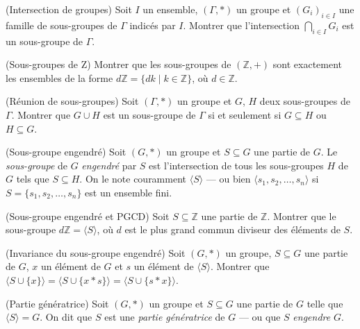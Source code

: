 \begin{exo}(Intersection de groupes)
Soit $I$ un ensemble, $(\Gamma, \ast)$ un groupe et
$(G_i)_{i \in I}$ une famille de sous-groupes de $\Gamma$ indicés par $I$.
Montrer que l'intersection $\bigcap_{i \in I}G_i$ est un sous-groupe de $\Gamma$.
\end{exo}

\begin{exo}(Sous-groupes de Z)
Montrer que les sous-groupes de $(\mathbb{Z},+)$ sont exactement les ensembles
de la forme $d \mathbb{Z} = \{d k \mid k \in \mathbb{Z}\}$, où $d \in \mathbb{Z}$.
\end{exo}

\begin{exo}(Réunion de sous-groupes)
Soit $(\Gamma, \ast)$ un groupe et
$G$, $H$ deux sous-groupes de $\Gamma$.
Montrer que $G \cup H$ est un sous-groupe de $\Gamma$ si et seulement si
$G \subseteq H$ ou $H \subseteq G$.
\end{exo}

\begin{defn}(Sous-groupe engendré)
Soit $(G, \ast)$ un groupe et $S \subseteq G$ une partie de $G$.
Le \emph{sous-groupe} de $G$ \emph{engendré} par $S$ est l'intersection de
tous les sous-groupes $H$ de $G$ tels que $S \subseteq H$.
On le note couramment $\langle S\rangle$ --- ou bien
$\langle s_1, s_2, \dots, s_n \rangle$ si $S = \{s_1, s_2, \dots, s_n\}$ est un ensemble fini.
\end{defn}

\begin{exo}(Sous-groupe engendré et PGCD)
Soit $S \subseteq \mathbb{Z}$ une partie de $\mathbb{Z}$.
Montrer que le sous-groupe $d \mathbb{Z} = \langle S \rangle$, où
$d$ est le plus grand commun diviseur des éléments de $S$.
\end{exo}

\begin{exo}(Invariance du sous-groupe engendré)
Soit $(G, \ast)$ un groupe, $S \subseteq G$ une partie de $G$,
$x$ un élément de $G$ et $s$ un élément de $\langle S \rangle$.
Montrer que $\langle S \cup \{x\} \rangle = \langle S \cup \{x \ast s\} \rangle = \langle S \cup \{s \ast x\} \rangle$. 
\end{exo}

\begin{defn}(Partie génératrice)
Soit $(G, \ast)$ un groupe et $S \subseteq G$ une partie de $G$ telle que
$\langle S \rangle = G$.
On dit que $S$ est une \emph{partie génératrice} de $G$ --- ou que
$S$ \emph{engendre} $G$.
\end{defn}

